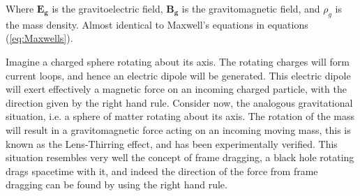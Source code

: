 Where $\mathbf{E_g}$ is the gravitoelectric field, $\mathbf{B_g}$ is the gravitomagnetic field, and $\rho_g$ is the mass density. Almost identical to Maxwell's equations in equations (\ref{eq:Maxwells}).

Imagine a charged sphere rotating about its axis. The rotating charges will form current loops, and hence an electric dipole will be generated. This electric dipole will exert effectively a magnetic force on an incoming charged particle, with the direction given by the right hand rule. Consider now, the analogous gravitational situation, i.e. a sphere of matter rotating about its axis. The rotation of the mass will result in a gravitomagnetic force acting on an incoming moving mass, this is known as the Lens-Thirring effect, and has been experimentally verified. This situation resembles very well the concept of frame dragging, a black hole rotating drags spacetime with it, and indeed the direction of the force from frame dragging can be found by using the right hand rule.

